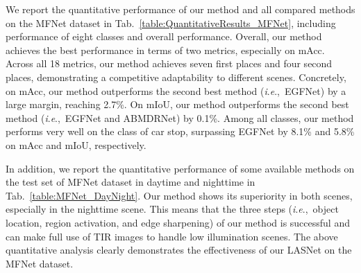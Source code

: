 \documentclass[journal]{IEEEtran}
\newcommand{\ie}{\textit{i}.\textit{e}.,~}
\begin{document}
We report the quantitative performance of our method and all compared methods on the MFNet dataset in Tab.~\ref{table:QuantitativeResults_MFNet}, including performance of eight classes and overall performance.
Overall, our method achieves the best performance in terms of two metrics, especially on mAcc.
Across all 18 metrics, our method achieves seven first places and four second places, demonstrating a competitive adaptability to different scenes.
Concretely, on mAcc, our method outperforms the second best method (\ie EGFNet) by a large margin, reaching 2.7\%.
On mIoU, our method outperforms the second best method (\ie EGFNet and ABMDRNet) by 0.1\%.
Among all classes, our method performs very well on the class of car stop, surpassing EGFNet by 8.1\% and 5.8\% on mAcc and mIoU, respectively.


In addition, we report the quantitative performance of some available methods on the test set of MFNet dataset in daytime and nighttime in Tab.~\ref{table:MFNet_DayNight}.
Our method shows its superiority in both scenes, especially in the nighttime scene.
This means that the three steps (\ie object location, region activation, and edge sharpening) of our method is successful and can make full use of TIR images to handle low illumination scenes.
The above quantitative analysis clearly demonstrates the effectiveness of our LASNet on the MFNet dataset.
\end{document}
